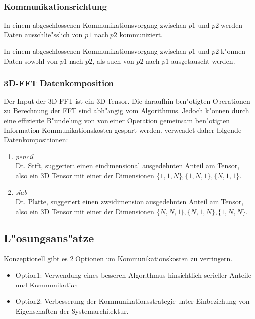 \subsubsection{Kommunikationsrichtung}
\begin{defi}
In einem abgeschlossenen Kommunikationsvorgang zwischen $p1$ und $p2$ werden Daten ausschlie"sslich von $p1$ nach $p2$ kommuniziert.
\end{defi}
\begin{defi}
In einem abgeschlossenen Kommunikationsvorgang zwischen $p1$ und $p2$ k"onnen Daten sowohl von $p1$ nach $p2$, als auch von $p2$ nach $p1$ ausgetauscht werden.
\end{defi}

\subsubsection{3D-FFT Datenkomposition}
Der Input der 3D-FFT ist ein 3D-Tensor. Die daraufhin ben"otigten Operationen zu Berechnung der FFT sind abh"angig vom Algorithmus. Jedoch k"onnen durch eine effiziente B"undelung von von einer Operation gemeinsam ben"otigten Information Kommunikationskosten gespart werden.
\cite{mainpaper} verwendet daher folgende Datenkompositionen:
\begin{enumerate}
	\item \textit{pencil}\\
		Dt. Stift, suggeriert einen eindimensional ausgedehnten Anteil am Tensor, also ein 3D Tensor mit einer der Dimensionen $\{1,1,N\},\{1,N,1\},\{N,1,1\}$.
	\item \textit{slab}\\
		Dt. Platte, suggeriert einen zweidimension ausgedehnten Anteil am Tensor, also ein 3D Tensor mit einer der Dimensionen $\{N,N,1\},\{N,1,N\},\{1,N,N\}$.
\end{enumerate}

\subsection{L"osungsans"atze}
Konzeptionell gibt es 2 Optionen um Kommunikationskosten zu verringern.
\begin{itemize}
	\item Option1: Verwendung eines besseren Algorithmus hinsichtlich serieller Anteile und Kommunikation.
	\item Option2: Verbesserung der Kommunikationsstrategie unter Einbeziehung von Eigenschaften der Systemarchitektur.
\end{itemize}

